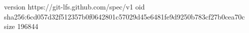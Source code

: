 version https://git-lfs.github.com/spec/v1
oid sha256:6cd057d32f512357b0f0642801c57029d45e6481fe9d9250b783cf27b0cea70c
size 196844
